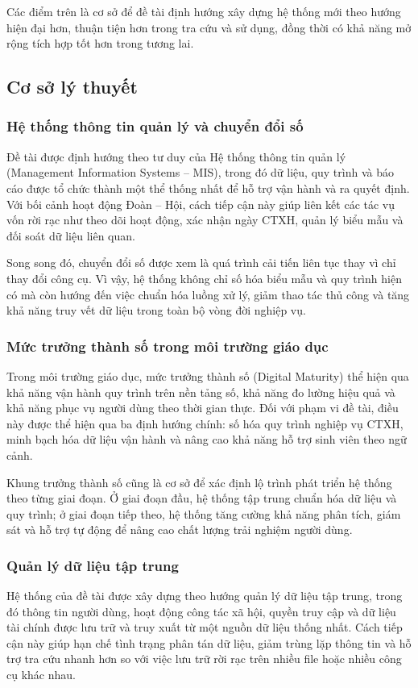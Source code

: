 Các điểm trên là cơ sở để đề tài định hướng xây dựng hệ thống mới theo hướng hiện đại hơn, thuận tiện hơn trong tra cứu và sử dụng, đồng thời có khả năng mở rộng tích hợp tốt hơn trong tương lai.

\subsection{Cơ sở lý thuyết}
\subsubsection{Hệ thống thông tin quản lý và chuyển đổi số}
Đề tài được định hướng theo tư duy của Hệ thống thông tin quản lý (Management Information Systems -- MIS), trong đó dữ liệu, quy trình và báo cáo được tổ chức thành một thể thống nhất để hỗ trợ vận hành và ra quyết định. Với bối cảnh hoạt động Đoàn -- Hội, cách tiếp cận này giúp liên kết các tác vụ vốn rời rạc như theo dõi hoạt động, xác nhận ngày CTXH, quản lý biểu mẫu và đối soát dữ liệu liên quan.

Song song đó, chuyển đổi số được xem là quá trình cải tiến liên tục thay vì chỉ thay đổi công cụ. Vì vậy, hệ thống không chỉ số hóa biểu mẫu và quy trình hiện có mà còn hướng đến việc chuẩn hóa luồng xử lý, giảm thao tác thủ công và tăng khả năng truy vết dữ liệu trong toàn bộ vòng đời nghiệp vụ.

\subsubsection{Mức trưởng thành số trong môi trường giáo dục}
Trong môi trường giáo dục, mức trưởng thành số (Digital Maturity) thể hiện qua khả năng vận hành quy trình trên nền tảng số, khả năng đo lường hiệu quả và khả năng phục vụ người dùng theo thời gian thực. Đối với phạm vi đề tài, điều này được thể hiện qua ba định hướng chính: số hóa quy trình nghiệp vụ CTXH, minh bạch hóa dữ liệu vận hành và nâng cao khả năng hỗ trợ sinh viên theo ngữ cảnh.

Khung trưởng thành số cũng là cơ sở để xác định lộ trình phát triển hệ thống theo từng giai đoạn. Ở giai đoạn đầu, hệ thống tập trung chuẩn hóa dữ liệu và quy trình; ở giai đoạn tiếp theo, hệ thống tăng cường khả năng phân tích, giám sát và hỗ trợ tự động để nâng cao chất lượng trải nghiệm người dùng.

\subsubsection{Quản lý dữ liệu tập trung}
Hệ thống của đề tài được xây dựng theo hướng quản lý dữ liệu tập trung, trong đó thông tin người dùng, hoạt động công tác xã hội, quyền truy cập và dữ liệu tài chính được lưu trữ và truy xuất từ một nguồn dữ liệu thống nhất. Cách tiếp cận này giúp hạn chế tình trạng phân tán dữ liệu, giảm trùng lặp thông tin và hỗ trợ tra cứu nhanh hơn so với việc lưu trữ rời rạc trên nhiều file hoặc nhiều công cụ khác nhau.

